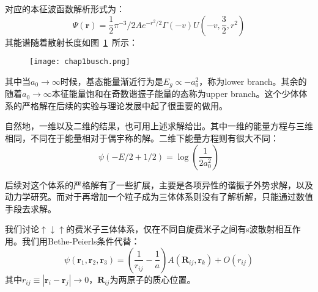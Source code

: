 对应的本征波函数解析形式为：
\begin{equation}
\Psi(\mathbf{r})=\frac{1}{2} \pi^{-3} / 2 A e^{-r^{2} / 2} \Gamma(-v) U\left(-v, \frac{3}{2}, r^{2}\right)
\end{equation}
其能谱随着散射长度如图~\ref{chap1busch}~所示：
\begin{figure}[!htbp]
    \centering
    \texttt{[image: chap1busch.png]}
    \label{chap1busch}
\end{figure}
其中当$a_0\to \infty$时候，基态能量渐近行为是$E_g\propto - a_0^2$，称为lower branch。其余的随着$a_0\to\infty$本征能量饱和在奇数谐振子能量的态称为upper branch。这个少体体系的严格解在后续的实验与理论发展中起了很重要的做用。

自然地，一维以及二维的结果，也可用上述求解给出。其中一维的能量方程与三维相同，不同在于能量相对于偶宇称的解。二维下能量方程则有很大不同：
\begin{equation}
\psi(-E / 2+1 / 2)=\log \left(\frac{1}{2 a_{0}^{2}}\right)
\end{equation}

后续对这个体系的严格解有了一些扩展，主要是各项异性的谐振子外势求解，以及动力学研究\cite{blume2012few}。而对于再增加一个粒子成为三体体系则没有了解析解，只能通过数值手段去求解。

我们讨论$\uparrow\downarrow\uparrow$的费米子三体体系，仅在不同自旋费米子之间有s波散射相互作用\cite{OlshaniiRigorous2001,Petrov2003unitary3b,Fleix2006prlunitary3b,Felix2006praunitary3b,LmDuan2007levelcrossing,Stetcu2007,Blume2008,Blume2010,Xiaji2009prl,Xiaji20103b,Rittenhouse2010green}。我们用Bethe-Peierls条件代替：
\begin{equation}
\psi\left(\mathbf{r}_{1}, \mathbf{r}_{2}, \mathbf{r}_{3}\right)=\left(\frac{1}{r_{i j}}-\frac{1}{a}\right) A\left(\mathbf{R}_{i j}, \mathbf{r}_{k}\right)+O\left(r_{i j}\right)
\end{equation}
其中$r_{i j} \equiv\left|\mathbf{r}_{i}-\mathbf{r}_{j}\right| \rightarrow 0$，$\mathbf{R}_{ij}$为两原子的质心位置。

